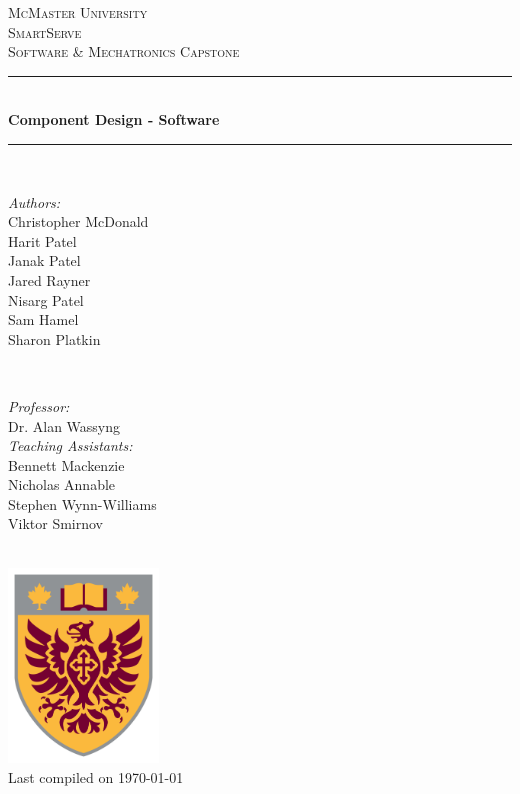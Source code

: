 \documentclass[11pt]{article}
\begin{document}
\begin{titlepage}
	\newcommand{\HRule}{\rule{\linewidth}{0.2mm}}
	\begin{center}
	\textsc{\LARGE McMaster University}\\[1.5cm]

	\textsc{\Large SmartServe}\\[0.5cm]
	\textsc{\large Software \& Mechatronics Capstone}\\[0.5cm]

	\HRule\\[0.4cm]
		{\huge\bfseries Component Design - Software}\\[0.4cm]
	\HRule\\[0.4cm]

	\begin{minipage}[t][][t]{0.5\textwidth}
		\begin{flushleft} \large
			\emph{Authors:}\\
			Christopher McDonald\\
			Harit Patel \\
			Janak Patel \\
			Jared Rayner  \\
			Nisarg Patel  \\
			Sam Hamel \\
			Sharon Platkin \\
		\end{flushleft}
	\end{minipage}
	~
	\begin{minipage}[t][][t]{0.4\textwidth}
		\begin{flushright} \large
			\emph{Professor:} \\
			Dr. Alan Wassyng \\[0.4cm]
			\emph{Teaching Assistants:} \\
			Bennett Mackenzie \\
			Nicholas Annable \\
			Stephen Wynn-Williams \\
			Viktor Smirnov
		\end{flushright}
	\end{minipage}\\[2cm]

	\includegraphics[width=0.3\textwidth]{../logo.png} \\
	{\large Last compiled on \today}
	\end{center}

\end{titlepage}
\end{document}
